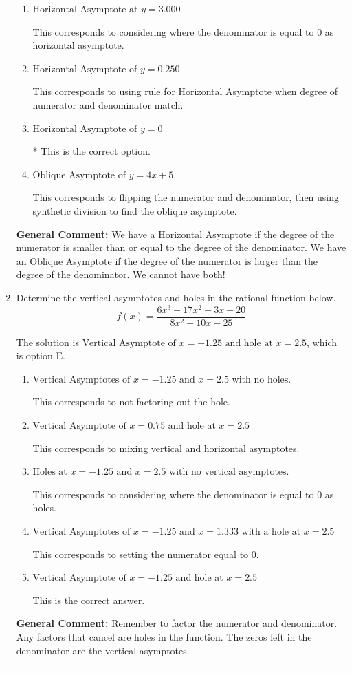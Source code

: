 \documentclass{extbook}[14pt]
\newcommand{\litem}[1]{\item #1

\rule{\textwidth}{0.4pt}}
\begin{document}
\begin{enumerate}
{\begin{enumerate}[label=\Alph*.]
This corresponds to believing there can be both a horizontal and oblique asymptote.
\item \( \text{Horizontal Asymptote at } y = 3.000 \)

This corresponds to considering where the denominator is equal to 0 as horizontal asymptote.
\item \( \text{Horizontal Asymptote of } y = 0.250  \)

This corresponds to using rule for Horizontal Asymptote when degree of numerator and denominator match.
\item \( \text{Horizontal Asymptote of } y = 0 \)

* This is the correct option.
\item \( \text{Oblique Asymptote of } y = 4x + 5. \)

This corresponds to flipping the numerator and denominator, then using synthetic division to find the oblique asymptote.
\end{enumerate}

\textbf{General Comment:} We have a Horizontal Asymptote if the degree of the numerator is smaller than or equal to the degree of the denominator. We have an Oblique Asymptote if the degree of the numerator is larger than the degree of the denominator. We cannot have both!
}
\litem{
Determine the vertical asymptotes and holes in the rational function below.
\[ f(x) = \frac{6x^{3} -17 x^{2} -3 x + 20}{8x^{2} -10 x -25} \]

The solution is \( \text{Vertical Asymptote of } x = -1.25 \text{ and hole at } x = 2.5 \), which is option E.\begin{enumerate}[label=\Alph*.]
\item \( \text{Vertical Asymptotes of } x = -1.25 \text{ and } x = 2.5 \text{ with no holes.} \)

This corresponds to not factoring out the hole.
\item \( \text{Vertical Asymptote of } x = 0.75 \text{ and hole at } x = 2.5 \)

This corresponds to mixing vertical and horizontal asymptotes.
\item \( \text{Holes at } x = -1.25 \text{ and } x = 2.5 \text{ with no vertical asymptotes.} \)

This corresponds to considering where the denominator is equal to 0 as holes.
\item \( \text{Vertical Asymptotes of } x = -1.25 \text{ and } x = 1.333 \text{ with a hole at } x = 2.5 \)

This corresponds to setting the numerator equal to 0.
\item \( \text{Vertical Asymptote of } x = -1.25 \text{ and hole at } x = 2.5 \)

This is the correct answer.
\end{enumerate}

\textbf{General Comment:} Remember to factor the numerator and denominator. Any factors that cancel are holes in the function. The zeros left in the denominator are the vertical asymptotes.
}
\end{enumerate}
\end{document}

